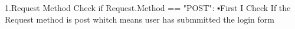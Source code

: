 1.Request Method Check
if Request.Method == "POST":
▪️First I Check If the Request method is post whitch means user has submmitted the login form
